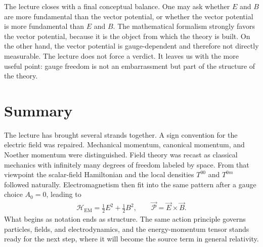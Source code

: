 The lecture closes with a final conceptual balance. One may ask whether \(E\) and \(B\) are more fundamental than the vector potential, or whether the vector potential is more fundamental than \(E\) and \(B\). The mathematical formalism strongly favors the vector potential, because it is the object from which the theory is built. On the other hand, the vector potential is gauge-dependent and therefore not directly measurable. The lecture does not force a verdict. It leaves us with the more useful point: gauge freedom is not an embarrassment but part of the structure of the theory.

\section{Summary}

The lecture has brought several strands together. A sign convention for the electric field was repaired. Mechanical momentum, canonical momentum, and Noether momentum were distinguished. Field theory was recast as classical mechanics with infinitely many degrees of freedom labeled by space. From that viewpoint the scalar-field Hamiltonian and the local densities \(T^{00}\) and \(T^{0m}\) followed naturally. Electromagnetism then fit into the same pattern after a gauge choice \(A_0=0\), leading to
\begin{align}
\mathcal H_{\mathrm{EM}}=\frac12E^2+\frac12B^2,
\qquad
\vec{\mathcal P}=\vec E\times \vec B.
\end{align}
What begins as notation ends as structure. The same action principle governs particles, fields, and electrodynamics, and the energy-momentum tensor stands ready for the next step, where it will become the source term in general relativity.
